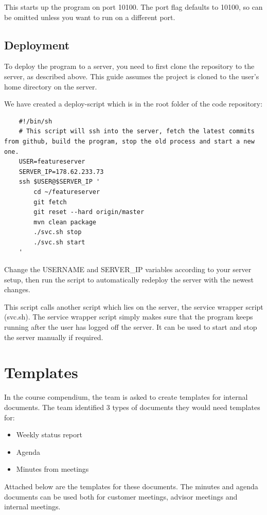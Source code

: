 \documentclass[11pt,a4paper,titlepage,oneside]{report}
\begin{document}
This starts up the program on port 10100. The port flag defaults to 10100, so can be omitted unless you want to run on a different port.

\section{Deployment}
To deploy the program to a server, you need to first clone the repository to the server, as described above.
This guide assumes the project is cloned to the user's home directory on the server.

We have created a deploy-script which is in the root folder of the code repository:
\begin{lstlisting}
	#!/bin/sh
	# This script will ssh into the server, fetch the latest commits from github, build the program, stop the old process and start a new one.
	USER=featureserver
	SERVER_IP=178.62.233.73
	ssh $USER@$SERVER_IP '
	    cd ~/featureserver
	    git fetch
	    git reset --hard origin/master
	    mvn clean package
	    ./svc.sh stop
	    ./svc.sh start
	'
\end{lstlisting}

Change the USERNAME and SERVER\_IP variables according to your server setup, then run the script to automatically redeploy the server with the newest changes.

This script calls another script which lies on the server, the service wrapper script (svc.sh).
The service wrapper script simply makes sure that the program keeps running after the user has logged off the server. It can be used to start and stop the server manually if required.

\chapter{Templates}
In the \gls{course compendium}, the team is asked to create templates for internal documents. The team identified 3 types of documents they would need templates for:

\begin{itemize}
\item Weekly status report
\item Agenda
\item Minutes from meetings
\end{itemize}

Attached below are the templates for these documents. The minutes and agenda documents can be used both for customer meetings, advisor meetings and internal meetings.




\end{document}
